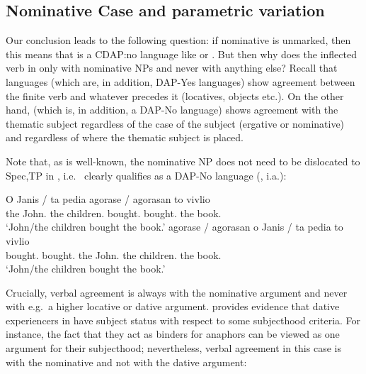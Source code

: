 \documentclass[output=paper]{langsci/langscibook}
\begin{document}
\begin{exe}
\section{Nominative Case and parametric variation}\label{sec:key:13.4}

Our conclusion leads to the following question: if nominative is unmarked, then
this means that  is a \gls{CDAP}:no language like  or
. But then
why does the inflected verb in  only  with nominative NPs and never
with anything else? Recall that  languages (which are, in addition,
DAP-Yes languages) show agreement between the finite verb and whatever precedes
it (locatives, objects etc.). On the other hand,  (which is, in
addition, a DAP-No language) shows agreement with the thematic subject
regardless of the case of the subject (ergative or nominative) and regardless
of where the thematic subject is placed.

Note that, as is well-known, the nominative NP does not need to be dislocated
to Spec,TP in , i.e.\  clearly qualifies as a DAP-No language
(\citealt{AleAna1998}, i.a.):\newpage

\ea%
\label{ex:key:13.32}
	\ea
	\gll  O Janis / ta pedia agorase / agorasan to vivlio\\
    the John.\Nom{} {} the children.\Nom{} bought.\Tsg{} {} bought.\Tpl{}  the book.\Acc{}\\
	\glt     ‘John/the children bought the book.’
	\ex
	\gll  agorase / agorasan o Janis / ta pedia to vivlio\\
    bought.\Tsg{} {} bought.\Tpl{} the John.\Nom{} {} the children.\Nom{}  the book.\Acc{}\\
	\glt     ‘John/the children bought the book.’
    \z
\z

Crucially, verbal agreement is always with the nominative argument and never
with e.g.\ a higher locative or dative argument. \citet{Anagnostopoulou1999}
provides evidence that dative experiencers in  have subject status with
respect to some subjecthood criteria. For instance, the fact that they act as
binders for anaphors can be viewed as one argument for their subjecthood;
nevertheless, verbal agreement in this case is with the nominative and not with
the dative argument:


\end{exe}
\end{document}
